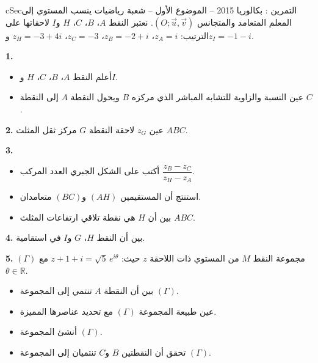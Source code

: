 \documentclass[12pt,a4paper]{article}
\newenvironment{BOX}[2]{\begin{otherlanguage}{english}\begin{arbox}{#1}{#2}}{\end{arbox}\end{otherlanguage}}
\newcounter{exo}
\newenvironment{tamrin}[1]{\stepcounter{exo}\begin{BOX}{cSec}{التمرين \theexo: #1}}{\end{BOX}}
\newenvironment{sq}{\begin{itemize}[leftmargin=2.4em,itemsep=3pt]}{\end{itemize}}
\newcommand{\qa}{\item[(أ)]}\newcommand{\qb}{\item[(ب)]}\newcommand{\qc}{\item[(جـ)]}\newcommand{\qd}{\item[(د)]}\newcommand{\qe}{\item[(هـ)]}
\newcommand{\QQ}[1]{\par\smallskip\textbf{#1.} }
\begin{document}
\begin{tamrin}{بكالوريا 2015 -- الموضوع الأول -- شعبة رياضيات}
ينسب المستوي إلى المعلم المتعامد والمتجانس $\left(O;\vec u,\vec v\right)$. نعتبر النقط $A$، $B$، $C$، $H$ و$I$ لاحقاتها على الترتيب:
$z_A=i$، $z_B=-2+i$، $z_C=-3$، $z_H=-3+4i$ و$z_I=-1-i$.

\QQ{1}
\begin{sq}
\qa أعلم النقط $A$، $B$، $C$، $H$ و$I$.
\qb عين النسبة والزاوية للتشابه المباشر الذي مركزه $B$ ويحول النقطة $A$ إلى النقطة $C$.
\end{sq}
\QQ{2} عين $z_G$ لاحقة النقطة $G$ مركز ثقل المثلث $ABC$.

\QQ{3}
\begin{sq}
\qa أكتب على الشكل الجبري العدد المركب $\dfrac{z_B-z_C}{z_H-z_A}$.
\qb استنتج أن المستقيمين $(AH)$ و$(BC)$ متعامدان.
\qc بين أن $H$ هي نقطة تلاقي ارتفاعات المثلث $ABC$.
\end{sq}
\QQ{4} بين أن النقط $H$، $G$ و$I$ في استقامية.

\QQ{5} $(\Gamma)$ مجموعة النقط $M$ من المستوي ذات اللاحقة $z$ حيث: $z+1+i=\sqrt5\,e^{i\theta}$ مع $\theta\in\mathbb{R}$.
\begin{sq}
\qa بين أن النقطة $A$ تنتمي إلى المجموعة $(\Gamma)$.
\qb عين طبيعة المجموعة $(\Gamma)$ مع تحديد عناصرها المميزة.
\qc أنشئ المجموعة $(\Gamma)$.
\qd تحقق أن النقطتين $B$ و$C$ تنتميان إلى المجموعة $(\Gamma)$.
\end{sq}
\end{tamrin}
\end{document}
